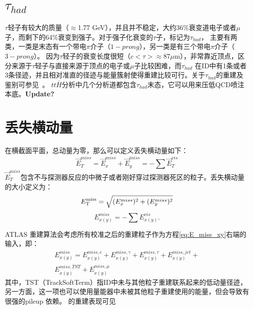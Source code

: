 \section{$\tau_{had}$}
$\tau$轻子有较大的质量（$\approx$1.77 GeV），并且并不稳定，大约36\%衰变道电子或者$\mu$子，而剩下的64\%衰变到强子。对于强子化衰变的$\tau$子，标记为$\tau_{had}$，
主要有两类，一类是末态有一个带电$\pi$介子（$1-prong$），另一类是有三个带电$\pi$介子（$3-prong$）。
因为$\tau$轻子的衰变长度很短（$c<\tau>\approx87\mu$m），非常靠近顶点，区分来源于$\tau$轻子与直接来源于顶点的电子或$\mu$子比较困难，而$\tau_{had}$
在ID中有1条或者3条径迹，并且相对准直的径迹与能量簇射使得重建比较可行。关于$\tau_{had}$的重建及鉴别可参见~\cite{ATL-PHYS-PUB-2015-045}。
$tt\bar{H}$分析中几个分析道都包含$\tau_{had}$末态，它可以用来压低QCD喷注本底。\textbf{Update?}

\section{丢失横动量}
在横截面平面，总动量为零，那么可以定义丢失横动量如下：
\begin{equation}
\overrightarrow{E}_{T}^{miss}=\overrightarrow{E}_{x}^{miss}+\overrightarrow{E}_{y}^{miss}=-\sum \overrightarrow{E}_{T}^{vis}
\end{equation}
$\overrightarrow{E}_{T}^{miss}$包含不与探测器反应的中微子或者刚好穿过探测器死区的粒子。丢失横动量的大小定义为：
\begin{equation}
 E_{\text{T}}^{\text{miss}}=\sqrt{(E_x^{miss})^2+(E_y^{miss})^2}
\end{equation}
\begin{equation}\label{eq:E_miss_xy}
  E_{x(y)}^{miss}=-\sum E_{x(y)}^{vis}.
\end{equation}

ATLAS \met 重建算法\cite{Aaboud:2018tkc}会考虑所有校准之后的重建粒子作为方程\ref{eq:E_miss_xy}右端的输入，即：
\begin{equation}
\begin{aligned}
 E_{x(y)}^{miss}=E_{x(y)}^{miss,e}+E_{x(y)}^{miss,\gamma}+E_{x(y)}^{miss,\tau}+E_{x(y)}^{miss,jet}+\\
 E_{x(y)}^{miss,TST}+E_{x(y)}^{miss,\mu}
 \end{aligned}
\end{equation}
其中，TST（TrackSoftTerm）指ID中未与其他粒子重建联系起来的低动量径迹，另一方面，这一项也可以使用量能器中未被其他粒子重建使用的能量，但会导致\met 有很强的pileup 依赖。
\met 的重建表现可见\cite{Aaboud:2018tkc}